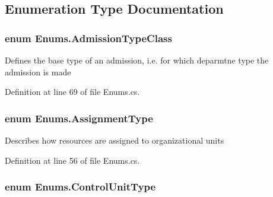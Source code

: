 \subsection{Enumeration Type Documentation}
\subsubsection[{\texorpdfstring{Admission\+Type\+Class}{AdmissionTypeClass}}]{\setlength{\rightskip}{0pt plus 5cm}enum {\bf Enums.\+Admission\+Type\+Class}\hspace{0.3cm}{\ttfamily [strong]}}\hypertarget{namespace_enums_a2d94ac8cd083deb7c44bcb8c8e3c5eea}{}\label{namespace_enums_a2d94ac8cd083deb7c44bcb8c8e3c5eea}


Defines the base type of an admission, i.\+e. for which deparmtne type the admission is made 



Definition at line 69 of file Enums.\+cs.

\subsubsection[{\texorpdfstring{Assignment\+Type}{AssignmentType}}]{\setlength{\rightskip}{0pt plus 5cm}enum {\bf Enums.\+Assignment\+Type}\hspace{0.3cm}{\ttfamily [strong]}}\hypertarget{namespace_enums_ac8e46c12834f4cb6a641854bd0676221}{}\label{namespace_enums_ac8e46c12834f4cb6a641854bd0676221}


Describes how resources are assigned to organizational units 



Definition at line 56 of file Enums.\+cs.

\subsubsection[{\texorpdfstring{Control\+Unit\+Type}{ControlUnitType}}]{\setlength{\rightskip}{0pt plus 5cm}enum {\bf Enums.\+Control\+Unit\+Type}\hspace{0.3cm}{\ttfamily [strong]}}\hypertarget{namespace_enums_aeea01f7c2eb29cb3e9e88daa9732d231}{}\label{namespace_enums_aeea01f7c2eb29cb3e9e88daa9732d231}


